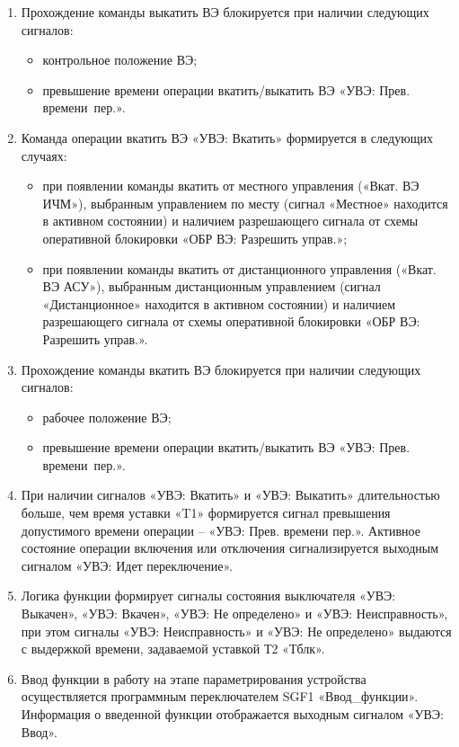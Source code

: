 \begin{enumerate}
\begin{enumerate}
\item
Прохождение команды выкатить ВЭ блокируется при наличии следующих сигналов:
\begin{itemize}
	\item контрольное положение ВЭ;
	\item превышение времени операции вкатить/выкатить ВЭ «УВЭ: Прев. времени~пер.».
\end{itemize}

\item
Команда операции вкатить ВЭ «УВЭ: Вкатить» формируется в следующих случаях:
\begin{itemize}
	\item при появлении команды вкатить от местного управления («Вкат. ВЭ ИЧМ»), выбранным управлением по месту (сигнал «Местное» находится в активном состоянии) и наличием разрешающего сигнала от схемы оперативной блокировки «ОБР ВЭ: Разрешить управ.»;
	\item при появлении команды вкатить от дистанционного управления («Вкат. ВЭ АСУ»), выбранным дистанционным управлением (сигнал «Дистанционное» находится в активном состоянии) и наличием разрешающего сигнала от схемы оперативной блокировки «ОБР ВЭ: Разрешить управ.».
\end{itemize}

\item
Прохождение команды вкатить ВЭ блокируется при наличии следующих сигналов:
\begin{itemize}
	\item рабочее положение ВЭ;
	\item превышение времени операции вкатить/выкатить ВЭ «УВЭ: Прев. времени~пер.».
\end{itemize}

\item
При наличии сигналов «УВЭ: Вкатить» и «УВЭ: Выкатить» длительностью больше, чем время уставки «T1» формируется сигнал превышения допустимого времени операции -- «УВЭ: Прев. времени пер.». Активное состояние операции включения или отключения сигнализируется выходным сигналом «УВЭ: Идет переключение».

\item
Логика функции формирует сигналы состояния выключателя «УВЭ: Выкачен», «УВЭ: Вкачен», «УВЭ: Не определено» и «УВЭ: Неисправность», при этом сигналы «УВЭ: Неисправность» и «УВЭ: Не определено» выдаются с выдержкой времени, задаваемой уставкой Т2 «Тблк».

\item
Ввод функции в работу на этапе параметрирования устройства осуществляется программным переключателем SGF1 «Ввод\_функции». Информация о введенной функции отображается выходным сигналом «УВЭ: Ввод».


\end{enumerate}
\end{enumerate}
